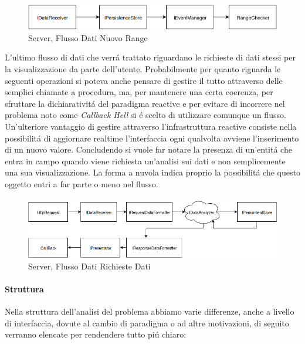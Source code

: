 \begin{figure}[h]
\centering
\includegraphics[width=\textwidth]{Figures/LogicArchitecture/Server/FlowDiagramNewRange}
\caption{Server, Flusso Dati Nuovo Range}
\end{figure}

L'ultimo flusso di dati che verr\'a trattato riguardano le richieste di dati stessi per la visualizzazione da parte dell'utente. Probabilmente per quanto riguarda le seguenti operazioni si poteva anche pensare di gestire il tutto attraverso delle semplici chiamate a procedura, ma, per mantenere una certa coerenza, per sfruttare la dichiarativit\'a del paradigma reactive e per evitare di incorrere nel problema noto come \textit{Callback Hell} si \'e scelto di utilizzare comunque un flusso. Un'ulteriore vantaggio di gestire attraverso l'infrastruttura reactive consiste nella possibilit\'a di aggiornare realtime l'interfaccia ogni qualvolta avviene l'inserimento di un nuovo valore. Concludendo si vuole far notare la presenza di un'entit\'a che entra in campo quando viene richiesta un'analisi sui dati e non semplicemente una sua visualizzazione. La forma a nuvola indica proprio la possibilit\'a che questo oggetto entri a far parte o meno nel flusso.

\newpage

\begin{figure}[h]
\centering
\includegraphics[width=\textwidth]{Figures/LogicArchitecture/Server/FlowDiagramViewData}
\caption{Server, Flusso Dati Richieste Dati}
\end{figure}


\paragraph{Struttura}

Nella struttura dell'analisi del problema abbiamo varie differenze, anche a livello di interfaccia, dovute al cambio di paradigma o ad altre motivazioni, di seguito verranno elencate per rendendere tutto pi\'u chiaro:


